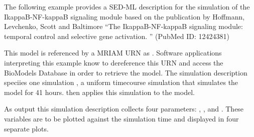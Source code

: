 The following example provides a SED-ML description for the simulation of the IkappaB-NF-kappaB signaling module based on the publication by Hoffmann, Levchenko, Scott and  Baltimore ``The IkappaB-NF-kappaB signaling module: temporal control and selective gene activation. '' (PubMed ID: 12424381)

This model is referenced by a MRIAM URN as . Software applications interpreting this example know to dereference this URN and access the BioModels Database \citep{N+06} in order to retrieve the model. The simulation description speciies one simulation , a uniform timecourse simulation that simulates the model for 41 hours.  then applies this simulation to the model. 

As output this simulation description collects four parameters: , ,  and . These variables are to be plotted against the simulation time and displayed in four separate plots. 



